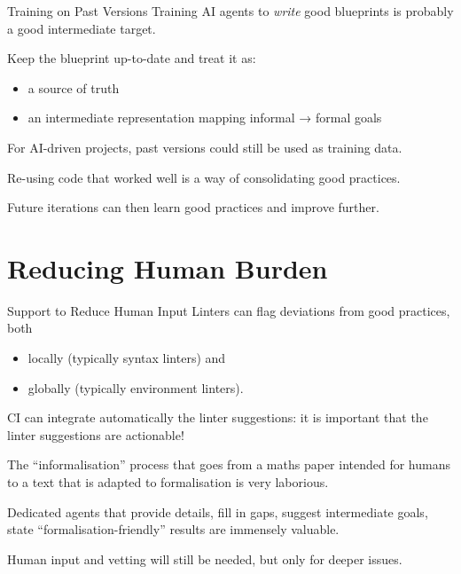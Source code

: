 \documentclass{beamer}
\begin{document}
\begin{frame}{Training on Past Versions}
Training AI agents to \emph{write} good blueprints is probably a good intermediate target.

\bigskip

Keep the blueprint up-to-date and treat it as:

\medskip

\begin{itemize}
  \item a source of truth
  \smallskip
  \item an intermediate representation mapping informal → formal goals
\end{itemize}

For AI-driven projects, past versions could still be used as training data.

\bigskip

Re-using code that worked well is a way of consolidating good practices.

\bigskip

Future iterations can then learn good practices and improve further.
\end{frame}

\section{Reducing Human Burden}

\begin{frame}{Support to Reduce Human Input}
Linters can flag deviations from good practices, both
\begin{itemize}
  \item locally (typically syntax linters) and
  \item globally (typically environment linters).
\end{itemize}

\bigskip

CI can integrate automatically the linter suggestions: it is important that the linter suggestions are actionable!

\bigskip

The ``informalisation'' process that goes from a maths paper intended for humans to a text that is adapted to formalisation is very laborious.

\bigskip

Dedicated agents that provide details, fill in gaps, suggest intermediate goals, state ``formalisation-friendly'' results are immensely valuable.

\bigskip

Human input and vetting will still be needed, but only for deeper issues.
\end{frame}
\end{document}
